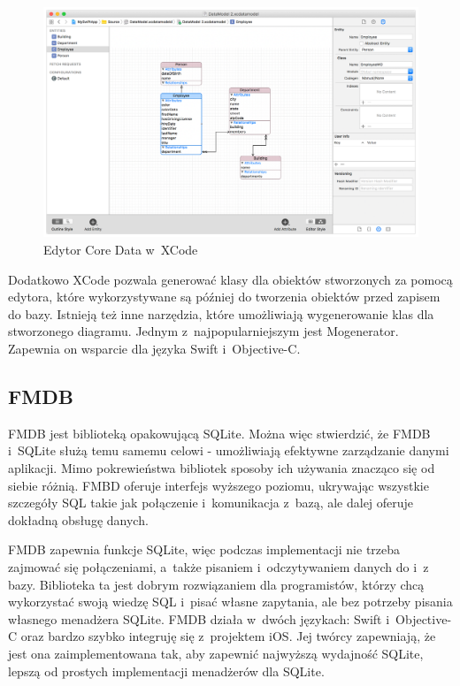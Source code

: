 \begin{figure}[h]
	\includegraphics[width=\linewidth]{img/Entity_Inheritence_2_2x.png}
	\caption{Edytor Core Data w~XCode}
	\label{fig: CoreDataEdytor}
\end{figure}

Dodatkowo XCode pozwala generować klasy dla obiektów stworzonych za pomocą edytora, które wykorzystywane są później do tworzenia obiektów przed zapisem do bazy. Istnieją też inne narzędzia, które umożliwiają wygenerowanie klas dla stworzonego diagramu. Jednym z~najpopularniejszym jest Mogenerator. Zapewnia on wsparcie dla języka Swift i~Objective-C.

\newpage
\subsection{FMDB}

FMDB jest biblioteką opakowującą SQLite. Można więc stwierdzić, że FMDB i~SQLite służą temu samemu celowi - umożliwiają efektywne zarządzanie danymi aplikacji. Mimo pokrewieństwa bibliotek sposoby ich używania znacząco się od siebie różnią. FMBD oferuje interfejs wyższego poziomu, ukrywając wszystkie szczegóły SQL takie jak połączenie i~komunikacja z~bazą, ale dalej oferuje dokładną obsługę danych. \par 
FMDB zapewnia funkcje SQLite, więc podczas implementacji nie trzeba zajmować się połączeniami, a~także pisaniem i~odczytywaniem danych do i~z bazy. Biblioteka ta jest dobrym rozwiązaniem dla programistów, którzy chcą wykorzystać swoją wiedzę SQL i~pisać własne zapytania, ale bez potrzeby pisania własnego menadżera SQLite. FMDB działa w~dwóch językach: Swift i~Objective-C oraz bardzo szybko integruję się z~projektem iOS. Jej twórcy zapewniają, że jest ona zaimplementowana tak, aby zapewnić najwyższą wydajność SQLite, lepszą od prostych implementacji menadżerów dla SQLite. \par

